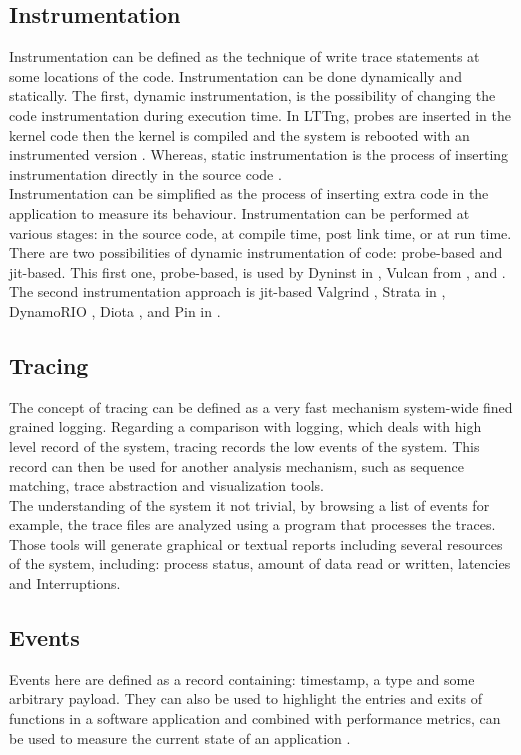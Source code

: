\subsection{Instrumentation}
Instrumentation can be defined as the technique of write trace statements at some locations of the code. 
Instrumentation can be done dynamically and statically. The first, dynamic instrumentation, is the possibility of changing the code instrumentation during execution time. In LTTng, probes are inserted in the kernel code then the kernel is compiled and the system is rebooted with an instrumented version \cite{TraceFile}.
Whereas, static instrumentation is the process of inserting instrumentation directly in the source code \cite{Graham82gprofa}. \\
Instrumentation can be simplified as the process of inserting extra code in the application to measure its behaviour. Instrumentation can be performed at various stages: in the source code, at compile time, post link time, or at run time. \\
There are two possibilities of dynamic instrumentation of code: probe-based and jit-based.  This first one, probe-based, is used by  Dyninst in \cite{dyninst}, Vulcan from \cite{Vulcan}, and \cite{dtrace}.  The second instrumentation approach is jit-based Valgrind \cite{Valgrind}, Strata in \cite{Strata}, DynamoRIO \cite{DynamoRIO}, Diota \cite{Diota}, and Pin in \cite{Pin}.

\subsection{Tracing}
The concept of tracing can be defined as a very fast mechanism system-wide fined grained logging. Regarding a comparison with logging, which deals with high level record of the system, tracing records the low events of the system. This record can then be used for another analysis mechanism, such as sequence matching, trace abstraction and visualization tools.\\
The understanding of the system it not trivial, by browsing a list of events for example, the trace files are analyzed using a program that processes the traces. Those tools will generate graphical or textual reports including several resources of the system, including: process status, amount of data read or written, latencies and Interruptions.

\subsection{Events}
Events here are defined as a record containing: timestamp, a type and some arbitrary payload. They can also be used to highlight the entries and exits of functions in a software application and combined with performance metrics, can be used to measure the current state of an application \cite{giraldeau-ols2011}.

